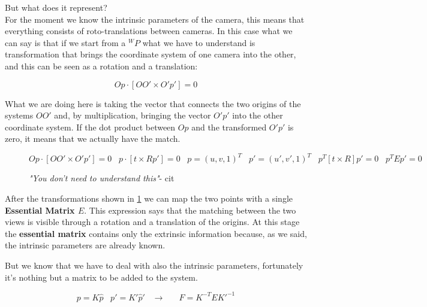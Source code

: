 But what does it represent? \\
For the moment we know the intrinsic parameters of the camera, this means that everything consists of roto-translations between cameras. In this case what we can say is that if we start from a \({}^WP\) what we have to understand is transformation that brings the coordinate system of one camera into the other, and this can be seen as a rotation and a translation:

\[
    Op\cdot[OO'\times O'p'] = 0
\]

What we are doing here is taking the vector that connects the two origins of the systems \(OO'\) and, by multiplication, bringing the vector \(O'p'\) into the other coordinate system. If the dot product between \(Op\) and the transformed \(O'p'\) is zero, it means that we actually have the match.

\begin{figure}[H]
\[
    Op\cdot[OO'\times O'p'] = 0 \;\;\;
    p\cdot[t\times Rp'] = 0 \;\;\;
    p = (u,v,1)^T \;\;\;
    p' = (u',v',1)^T \;\;\;
    p^T[t\times R]p'=0 \;\;\;
    p^TEp'=0    
\]
\caption{\textit{"You don't need to understand this"}- cit}
\label{eq:ess}
\end{figure}

After the transformations shown in \ref{eq:ess} we can map the two points with a single \textbf{Essential Matrix \(E\)}. This expression says that the matching between the two views is visible through a rotation and a translation of the origins. At this stage the \textbf{essential matrix} contains only the extrinsic information because, as we said, the intrinsic parameters are already known. %

But we know that we have to deal with also the intrinsic parameters, fortunately it's nothing but a matrix to be added to the system.

\[
    p = K\hat{p} \;\;\;
    p' = K'\hat{p}' \;\;\;
    \rightarrow \;\;\;\;\;\; 
    F= K^{-T}EK'^{-1}
\]

